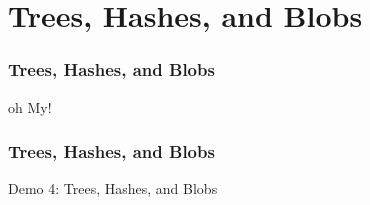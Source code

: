 \section[Section]{Trees, Hashes, and Blobs}

\begin{frame}
    \frametitle{Trees, Hashes, and Blobs}
    \alert{oh My!}
\end{frame}

\begin{frame}
    \frametitle{Trees, Hashes, and Blobs}
    \alert{Demo 4}: Trees, Hashes, and Blobs
\end{frame}
